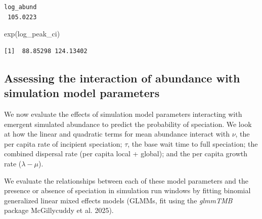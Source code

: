 \documentclass[
  letterpaper,
  DIV=11,
  numbers=noendperiod]{scrartcl}
\newenvironment{Shaded}{\begin{snugshade}}{\end{snugshade}}
\newcommand{\FunctionTok}[1]{\textcolor[rgb]{0.28,0.35,0.67}{#1}}
\newcommand{\NormalTok}[1]{\textcolor[rgb]{0.00,0.23,0.31}{#1}}
\begin{document}
\begin{verbatim}
log_abund 
 105.0223 
\end{verbatim}

\begin{Shaded}
\begin{Highlighting}[]
\FunctionTok{exp}\NormalTok{(log\_peak\_ci)}
\end{Highlighting}
\end{Shaded}

\begin{verbatim}
[1]  88.85298 124.13402
\end{verbatim}

\subsection{Assessing the interaction of abundance with simulation model
parameters}\label{assessing-the-interaction-of-abundance-with-simulation-model-parameters}

We now evaluate the effects of simulation model parameters interacting
with emergent simulated abundance to predict the probability of
speciation. We look at how the linear and quadratic terms for mean
abundance interact with \(\nu\), the per capita rate of incipient
speciation; \(\tau\), the base wait time to full speciation; the
combined dispersal rate (per capita local + global); and the per capita
growth rate (\(\lambda - \mu\)).

We evaluate the relationships between each of these model parameters and
the presence or absence of speciation in simulation run windows by
fitting binomial generalized linear mixed effects models (GLMMs, fit
using the \emph{glmmTMB} package McGillycuddy et al. 2025).
\end{document}

